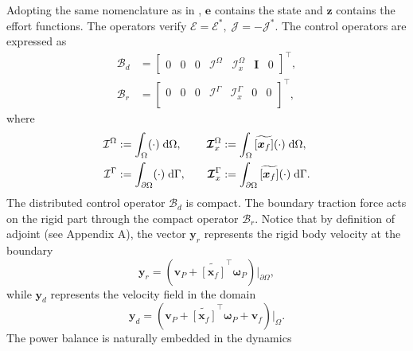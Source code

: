 \documentclass{svjour3}                     %
\newcommand{\crmat}[1]{\ensuremath{\widetilde{\left[#1\right]}}}
\begin{document}
	Adopting the same nomenclature as in \cite{mehrmann2019structurepreserving}, $\bm{e}$ contains the state and $\bm{z}$ contains the effort functions. The operators verify $\bm{\mathcal{E}} = \bm{\mathcal{E}}^*, \; \bm{\mathcal{J}} = -\bm{\mathcal{J}}^*$. The control operators are expressed as
	\begin{align*}
	\bm{\mathcal{B}}_d &= 
	\begin{bmatrix}
	0 & 0 & 0 & \mathcal{I}^\Omega & \bm{\mathcal{I}}_{x}^\Omega & \bm{I} & 0
	\end{bmatrix}^\top, \\
	\bm{\mathcal{B}}_r &= 
	\begin{bmatrix}
	0 & 0 & 0 & \mathcal{I}^{\Gamma} & \bm{\mathcal{I}}_{x}^{\Gamma} & 0 & 0 \\
	\end{bmatrix}^\top,
	\end{align*}
	where 
	\begin{equation*}
	\begin{aligned}
	\mathcal{I}^\Omega &:=\int_{\Omega} (\cdot) \d{\Omega}, \\
	\mathcal{I}^{\Gamma} &:= \int_{\partial \Omega} (\cdot) \d{\Gamma}, \\
	\end{aligned} \qquad
	\begin{aligned} 
	\bm{\mathcal{I}}_{x}^\Omega &:=\int_{\Omega} \crmat{\bm{x}_f} (\cdot) \d{\Omega}, \\
	\bm{\mathcal{I}}_{x}^{\Gamma} &:=\int_{\partial \Omega} \crmat{\bm{x}_f} (\cdot) \d{\Gamma}. \\
	\end{aligned}
	\end{equation*}
	The distributed control operator $\bm{\mathcal{B}}_d$  is compact. The boundary traction force acts on the rigid part through the compact operator $\bm{\mathcal{B}}_r$. Notice that by definition of adjoint (see Appendix A), the vector $\bm{y}_r$ represents the rigid body velocity at the boundary
	\[
	\bm{y}_r = (\bm{v}_P + \crmat{\bm{x}_f}^\top \bm{\omega}_P)\vert_{\partial\Omega},
	\] 
	while $\bm{y}_d$ represents the velocity field in the domain
	\[
	\bm{y}_d = (\bm{v}_P + \crmat{\bm{x}_f}^\top \bm{\omega}_P + \bm{v}_f)\vert_{\Omega}.
	\]
	The power balance is naturally embedded in the dynamics 
\end{document}
